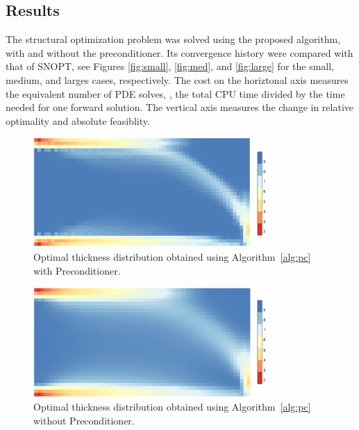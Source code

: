 \subsection{Results}
The structural optimization problem was solved using the proposed algorithm,
with and without the preconditioner. Its convergence history were compared with 
that of SNOPT, see Figures \ref{fig:small}, \ref{fig:med}, and \ref{fig:large} for the 
small, medium, and larges cases, respectively. The cost on the horiztonal axis 
measures the equivalent number of PDE solves, 
\ie, the total CPU time divided by the time needed for one
forward solution.  The vertical axis measures the change in relative optimality and
absolute feasiblity.    
  
\begin{figure}[tbp]
  \begin{center}
    \includegraphics*[width=0.8\textwidth]{./figs/chap6_fstopo/medium_thickness_color.pdf}%
    \caption{Optimal thickness distribution obtained using Algorithm~\ref{alg:pc} with Preconditioner.
      \label{fig:thick}}
  \end{center}
\end{figure}

\begin{figure}[tbp]
  \begin{center}
    \includegraphics*[width=0.8\textwidth]{./figs/chap6_fstopo/medium_eye_thickness_color.pdf}%
    \caption{Optimal thickness distribution obtained using Algorithm~\ref{alg:pc} without Preconditioner.
      \label{fig:thick_eye}}
  \end{center}
\end{figure}
    
